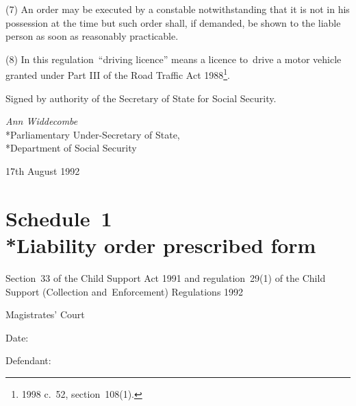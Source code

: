 \documentclass[12pt,a4paper]{article}
\begin{document}
(7) An order may be executed by a constable notwithstanding that it is not in his possession at the time but such order shall, if demanded, be shown to the liable person as soon as reasonably practicable.

(8) In this regulation~“driving licence” means a licence to~drive a motor vehicle granted under Part III of the Road Traffic Act 1988\footnote{1998 c.\ 52, section~108(1).}.


\bigskip

Signed by authority of the Secretary of State for Social Security.

{\raggedleft
\emph{Ann Widdecombe}\\*Parliamentary Under-Secretary of State,\\*Department of Social Security

}

17th August 1992

\vfill

\small

\part[Schedule~1 --- Liability order prescribed form]{Schedule~1\\*Liability order prescribed form}

\renewcommand\parthead{--- Schedule~1}

\noindent
Section~33 of the Child Support Act 1991 and regulation~29(1) of the Child Support (Collection and~Enforcement) Regulations 1992

\medskip

{\raggedleft \hspace{0.5\linewidth}\dotfill Magistrates' Court

}

\medskip

Date:

\medskip

Defendant:

\medskip
\end{document}
